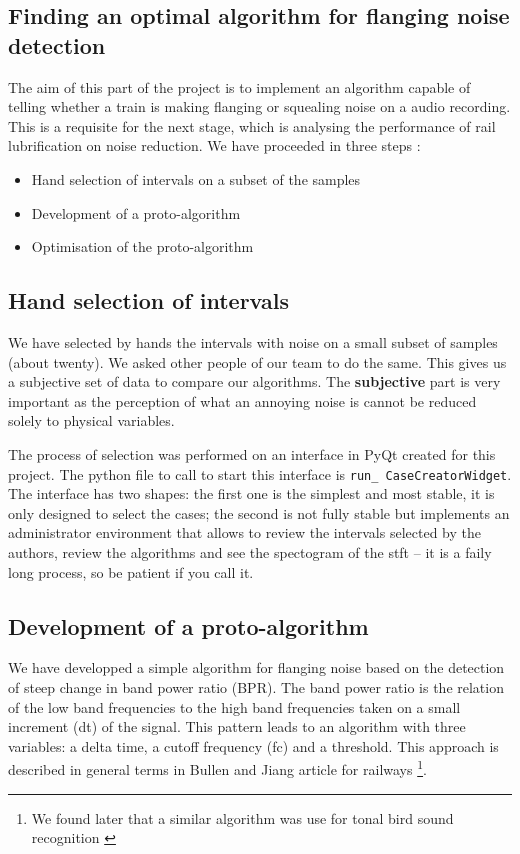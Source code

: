 \subsection{\label{sec:algtest}Finding an optimal algorithm for flanging noise detection}
The aim of this part of the project is to implement an algorithm capable of telling whether a train is making flanging or squealing noise on a audio recording. This is a requisite for the next stage, which is analysing the performance of rail lubrification on noise reduction. We have proceeded in three steps :
\begin{itemize}
\item Hand selection of intervals on a subset of the samples

\item Development of a proto-algorithm

\item Optimisation of the proto-algorithm
\end{itemize}

\subsection{Hand selection of intervals}
We have selected by hands the intervals with noise on a small subset of samples (about twenty). We asked other people of our team to do the same. This gives us a subjective set of data to compare our algorithms. The {\bf subjective} part is very important as the perception of what an annoying noise is cannot be reduced solely to physical variables.

The process of selection was performed on an interface in PyQt created for this project. The python file to call to start this interface is {\tt run\_ CaseCreatorWidget}. The interface has two shapes: the first one is the simplest and most stable, it is only designed to select the cases; the second is not fully stable but implements an administrator environment that allows to review the intervals selected by the authors, review the algorithms and see the spectogram of the stft -- it is a faily long process, so be patient if you call it. 

\subsection{Development of a proto-algorithm} We have developped a simple algorithm for flanging noise based on the detection of steep change in band power ratio (BPR). The band power ratio is the relation of the low band frequencies to the high band frequencies taken on a small increment (dt) of the signal. This pattern leads to an algorithm with three variables: a delta time, a cutoff frequency (fc) and a threshold. This approach is described in general terms in Bullen and Jiang article for railways \citeyear{Bullen2010}\footnote{We found later that a similar algorithm was use for tonal bird sound recognition \autocite{Jancovic2011}}.

